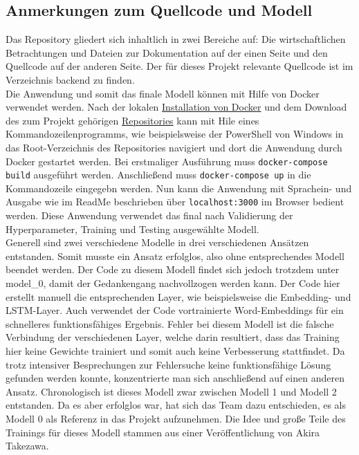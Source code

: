 \documentclass{aa}
\begin{document}
    \subsection{Anmerkungen zum Quellcode und Modell}\label{sec:code}
    Das Repository gliedert sich inhaltlich in zwei Bereiche auf: Die wirtschaftlichen Betrachtungen und Dateien zur Dokumentation auf der einen Seite und den Quellcode auf der anderen Seite. Der für dieses Projekt relevante Quellcode ist im Verzeichnis backend zu finden.\\
    Die Anwendung und somit das finale Modell können mit Hilfe von Docker verwendet werden. Nach der lokalen \href{https://docs.docker.com/desktop/}{Installation von Docker} und dem Download des zum Projekt gehörigen \href{https://github.com/SimonScapan/AuntElisa}{Repositories} kann mit Hile eines Kommandozeilenprogramms, wie beispielsweise der PowerShell von Windows in das Root-Verzeichnis des Repositories navigiert und dort die Anwendung durch Docker gestartet werden. Bei erstmaliger Ausführung muss \texttt{docker-compose build} ausgeführt werden. Anschließend muss \texttt{docker-compose up} in die Kommandozeile eingegebn werden. Nun kann die Anwendung mit Sprachein- und Ausgabe wie im ReadMe beschrieben über \texttt{localhost:3000} im Browser bedient werden. Diese Anwendung verwendet das final nach Validierung der Hyperparameter, Training und Testing ausgewählte Modell.\\
    Generell sind zwei verschiedene Modelle in drei verschiedenen Ansätzen entstanden. Somit musste ein Ansatz erfolglos, also ohne entsprechendes Modell beendet werden. Der Code zu diesem Modell findet sich jedoch trotzdem unter model\_0, damit der Gedankengang nachvollzogen werden kann. Der Code hier erstellt manuell die entsprechenden Layer, wie beispielsweise die Embedding- und LSTM-Layer. Auch verwendet der Code vortrainierte Word-Embeddings für ein schnelleres funktionsfähiges Ergebnis. Fehler bei diesem Modell ist die falsche Verbindung der verschiedenen Layer, welche darin resultiert, dass das Training hier keine Gewichte trainiert und somit auch keine Verbesserung stattfindet. Da trotz intensiver Besprechungen zur Fehlersuche keine funktionsfähige Lösung gefunden werden konnte, konzentrierte man sich anschließend auf einen anderen Ansatz. Chronologisch ist dieses Modell zwar zwischen Modell 1 und Modell 2 entstanden. Da es aber erfolglos war, hat sich das Team dazu entschieden, es als Modell 0 als Referenz in das Projekt aufzunehmen. Die Idee und große Teile des Trainings für dieses Modell stammen aus einer Veröffentlichung von Akira Takezawa. \cite[Vgl.]{takezawa}\\
\end{document}
